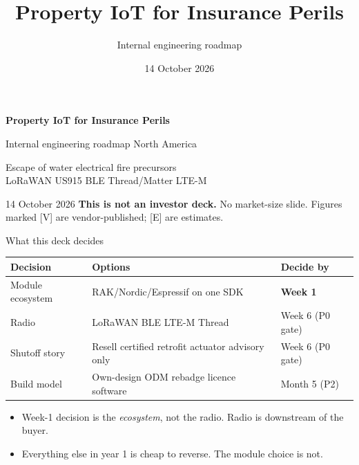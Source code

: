 \documentclass[aspectratio=169,t,10pt,xcolor={table,svgnames}]{beamer}
\title{Property IoT for Insurance Perils}
\subtitle{Internal engineering roadmap}
\date{14 October 2026}
\newcommand{\hd}[1]{\textbf{\footnotesize #1}}
\begin{document}
\begin{frame}[plain]
  \vspace{1.2cm}
  {\LARGE\bfseries Property IoT for Insurance Perils\par}
  \vspace{0.3cm}
  {\large\color{inkmute} Internal engineering roadmap \textperiodcentered{} North America\par}
  \vspace{0.9cm}
  {\footnotesize
   Escape of water \textperiodcentered{} electrical fire precursors\\
   LoRaWAN US915 \textperiodcentered{} BLE \textperiodcentered{} Thread/Matter \textperiodcentered{} LTE-M\par}
  \vspace{0.7cm}
  {\scriptsize\color{inkmute}
   14 October 2026 \textperiodcentered{} \textbf{This is not an investor deck.}
   No market-size slide. Figures marked [V] are vendor-published; [E] are estimates.\par}
\end{frame}

\begin{frame}{What this deck decides}
  \small
  \begin{tabular}{@{}p{}p{}p{}@{}}
    \toprule
    \hd{Decision} & \hd{Options} & \hd{Decide by} \\
    \midrule
    Module ecosystem & RAK/Nordic/Espressif on one SDK & \textbf{Week 1} \\
    Radio            & LoRaWAN \textperiodcentered{} BLE \textperiodcentered{} LTE-M \textperiodcentered{} Thread & Week 6 (P0 gate) \\
    Shutoff story    & Resell certified \textperiodcentered{} retrofit actuator \textperiodcentered{} advisory only & Week 6 (P0 gate) \\
    Build model      & Own-design \textperiodcentered{} ODM rebadge \textperiodcentered{} licence \textperiodcentered{} software & Month 5 (P2) \\
    \bottomrule
  \end{tabular}
  \vspace{0.6em}
  \begin{itemize}\footnotesize
    \item Week-1 decision is the \emph{ecosystem}, not the radio. Radio is downstream of the buyer.
    \item Everything else in year 1 is cheap to reverse. The module choice is not.
  \end{itemize}
\end{frame}
\end{document}
